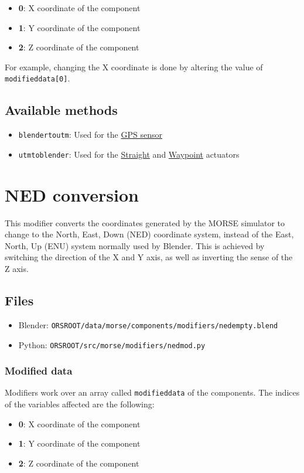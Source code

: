 \documentclass[twoside,a4paper,10pt]{report}
\newcommand{\dokutitlelevelone}[1]{\chapter{#1}}
\newcommand{\dokutitleleveltwo}[1]{\section{#1}}
\newcommand{\dokutitleleveltree}[1]{\subsection{#1}}
\newcommand{\dokubold}[1]{\textbf{#1}}
\newcommand{\dokumonospace}[1]{\texttt{#1}}
\newcommand{\dokuitem}{\item}
\begin{document}
\begin{itemize}
\dokuitem  \dokubold{0}: X coordinate of the component
\dokuitem  \dokubold{1}: Y coordinate of the component
\dokuitem  \dokubold{2}: Z coordinate of the component
\end{itemize}

For example, changing the X coordinate is done by altering the value of \dokumonospace{modified{\textunderscore}data[0]}.


\dokutitleleveltwo{Available methods}
\label{a2d06dcb42bbd0519b19166fd7f36cea}%

\begin{itemize}
\dokuitem  \dokumonospace{blender{\textunderscore}to{\textunderscore}utm}: Used for the \hyperref[11648e4e66e7ed6a86cb7f1d0cf604fe]{ GPS sensor}
\dokuitem  \dokumonospace{utm{\textunderscore}to{\textunderscore}blender}: Used for the \hyperref[6990a54322d9232390a784c5c9247dd6]{ Straight} and \hyperref[f75862c2bd0040eb683048c313dcaaa8]{ Waypoint} actuators
\end{itemize}

\dokutitlelevelone{NED conversion}
\label{95cc2c00e60ea8d7ee8c566b6598de36}%
\label{f68daad189b2fffd0b8cab5e36ec9d96}%
This modifier converts the coordinates generated by the MORSE simulator to change to the North, East, Down (NED) coordinate system, instead of the East, North, Up (ENU) system normally used by Blender.
This is achieved by switching the direction of the X and Y axis, as well as inverting the sense of the Z axis.


\dokutitleleveltwo{Files}
\label{45b963397aa40d4a0063e0d85e4fe7a1}%

\begin{itemize}
\dokuitem  Blender: \dokumonospace{{\textdollar}ORS{\textunderscore}ROOT/data/morse/components/modifiers/ned{\textunderscore}empty.blend}
\dokuitem  Python: \dokumonospace{{\textdollar}ORS{\textunderscore}ROOT/src/morse/modifiers/ned{\textunderscore}mod.py}
\end{itemize}

\dokutitleleveltree{Modified data}
\label{c1a1a093b7ca2545d0d88cac0ff8ccf6}%
Modifiers work over an array called \dokumonospace{modified{\textunderscore}data} of the components.
The indices of the variables affected are the following:


\begin{itemize}
\dokuitem  \dokubold{0}: X coordinate of the component
\dokuitem  \dokubold{1}: Y coordinate of the component
\dokuitem  \dokubold{2}: Z coordinate of the component
\end{itemize}
\end{document}
